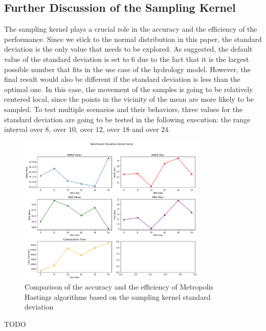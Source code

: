 \subsection{Further Discussion of the Sampling Kernel}
The sampling kernel plays a crucial role in the accuracy and the efficiency of the performance. Since we stick to the normal distribution in this paper, the standard deviation is the only value that needs to be explored. As suggested, the default value of the standard deviation is set to $6$ due to the fact that it is the largest possible number that fits in the use case of the hydrology model. However, the final result would also be different if the standard deviation is less than the optimal one. In this case, the movement of the samples is going to be relatively centered local, since the points in the vicinity of the mean are more likely to be sampled. To test multiple scenarios and their behaviors, three values for the standard deviation are going to be tested in the following execution: the range interval over $8$, over $10$, over $12$, over $18$ and over $24$.

\begin{figure}
    \centering
    \includegraphics[width=0.8\textwidth]{figures/basic_mh/benchmark/sensitivity_transition.png}
    \captionsetup{width=.8\textwidth}
    \caption{Comparison of the accuracy and the efficiency of Metropolis Hastings algorithms based on the sampling kernel standard deviation}
    \label{fig:enter-label}
\end{figure}

TODO

